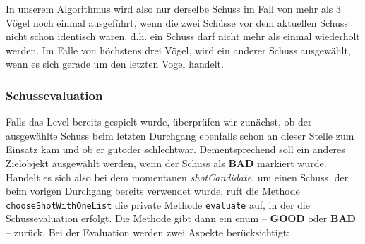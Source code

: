 In unserem Algorithmus wird also nur derselbe Schuss im Fall von mehr als 3 Vögel noch einmal ausgeführt, wenn die zwei Schüsse vor dem aktuellen Schuss nicht schon identisch waren, d.h. ein Schuss darf nicht mehr als einmal wiederholt werden. Im Falle von höchstens drei Vögel, wird ein anderer Schuss ausgewählt, wenn es sich gerade um den letzten Vogel handelt.

\subsubsection{Schussevaluation}
Falls das Level bereits gespielt wurde, überprüfen wir zunächst, ob der ausgewählte Schuss beim letzten Durchgang ebenfalls schon an dieser Stelle zum Einsatz kam und ob er \glqq gut\grqq oder \glqq schlecht\grqq war. Dementsprechend soll ein anderes Zielobjekt ausgewählt werden, wenn der Schuss als \textbf{BAD} markiert wurde. \\
Handelt es sich also bei dem momentanen \textit{shotCandidate}, um einen Schuss, der beim vorigen Durchgang bereits verwendet wurde, ruft die Methode \texttt{chooseShotWithOneList} die private Methode \texttt{evaluate} auf, in der die Schussevaluation erfolgt. Die Methode gibt dann ein enum -- \textbf{GOOD} oder \textbf{BAD} -- zurück. Bei der Evaluation werden zwei Aspekte berücksichtigt:
